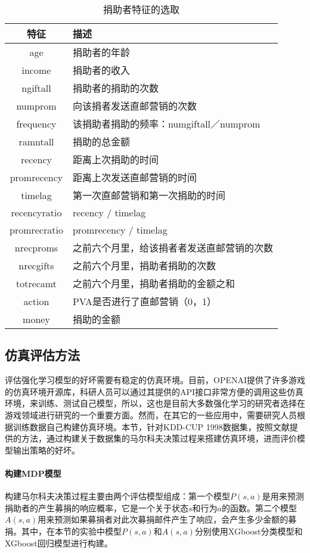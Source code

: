 \begin{table}[htbp]
  \centering
  \caption{捐助者特征的选取}
  \label{tab:obser_donors}
  \begin{tabular}{cl}
    \toprule
      特征 & 描述 \\
    \midrule
      age & 捐助者的年龄 \\
      income & 捐助者的收入 \\
      ngiftall & 捐助者的捐助的次数 \\
      numprom & 向该捐者发送直邮营销的次数 \\
      frequency & 该捐助者捐助的频率：numgiftall／numprom \\
      ramntall & 捐助的总金额 \\
      recency & 距离上次捐助的时间 \\
      promrecency & 距离上次发送直邮营销的时间\\
      timelag & 第一次直邮营销和第一次捐助的时间\\
      recencyratio & recency / timelag\\
	  promrecratio & promrecency / timelag\\
      nrecproms & 之前六个月里，给该捐者者发送直邮营销的次数\\
      nrecgifts & 之前六个月里，捐助者捐助的次数\\
      totrecamt & 之前六个月里，捐助者捐助的金额之和\\            	  
	  action & PVA是否进行了直邮营销（0，1）\\
	  money &  捐助的金额\\
    \bottomrule
  \end{tabular}
\end{table}

\subsection{仿真评估方法}
评估强化学习模型的好坏需要有稳定的仿真环境。目前，OPENAI提供了许多游戏的仿真环境开源库，科研人员可以通过其提供的API接口非常方便的调用这些仿真环境，来训练、测试自己模型，所以，这也是目前大多数强化学习的研究者选择在游戏领域进行研究的一个重要方面。然而，在其它的一些应用中，需要研究人员根据训练数据自己构建仿真环境。本节，针对KDD-CUP 1998数据集，按照文献\citep{pednault2002sequential}提供的方法，通过构建关于数据集的马尔科夫决策过程来搭建仿真环境，进而评价模型输出策略的好坏。

\paragraph{构建MDP模型}
构建马尔科夫决策过程主要由两个评估模型组成：第一个模型$P(s,a)$是用来预测捐助者的产生募捐的响应概率，它是一个关于状态$s$和行为$a$的函数。第二个模型$A(s,a)$用来预测如果募捐者对此次募捐邮件产生了响应，会产生多少金额的募捐。其中，在本节的实验中模型$P(s,a)$和$A(s,a)$分别使用XGboost分类模型和XGboost回归模型进行构建。

